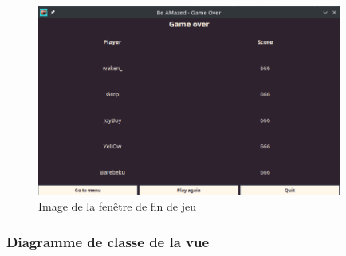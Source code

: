 \begin{figure}[!htb]%
    \centering
    \includegraphics[width=10cm]{ressources/Implementation/Labyrinthe/Vue/GameOver.png}%
    \caption{Image de la fenêtre de fin de jeu}%
    \label{fig:GameOverWindow}
\end{figure}
\FloatBarrier

\subsubsection*{Diagramme de classe de la vue}
